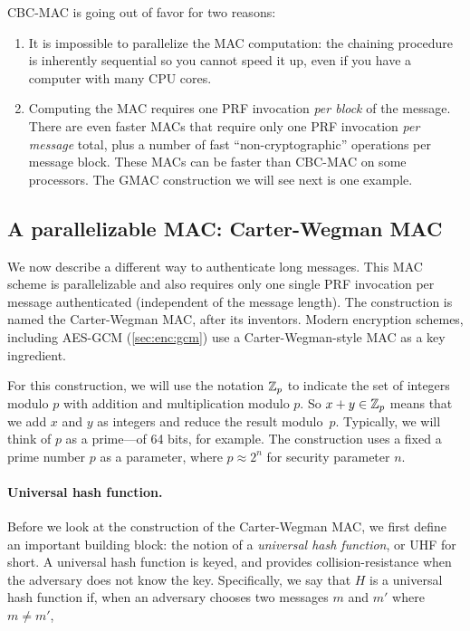 CBC-MAC is going out of favor for two reasons:
\begin{enumerate}
  \item It is impossible to parallelize the MAC computation:
        the chaining procedure is inherently sequential so you 
        cannot speed it up, even if you have a computer with many 
        CPU cores.
  \item Computing the MAC requires one PRF invocation \emph{per block} of the message.
        There are even faster MACs that require only one PRF invocation
        \emph{per message} total, 
        plus a number of fast ``non-cryptographic'' operations
        per message block.
        These MACs can be faster than CBC-MAC on some processors.
        The GMAC construction we will see next is one example.
\end{enumerate}


\subsection{A parallelizable MAC: Carter-Wegman MAC}\label{sec:mac:cw}

We now describe a different way to authenticate long messages.
This MAC scheme is parallelizable and also requires only one 
single PRF invocation per message authenticated (independent of
the message length).
The construction is named the Carter-Wegman MAC, after its
inventors.\autocite{CW81}
Modern encryption schemes, including AES-GCM (\cref{sec:enc:gcm})
use a Carter-Wegman-style MAC as a key ingredient.

For this construction, we will use the notation
$\mathbb{Z}_p$ to indicate the set of integers modulo $p$
with addition and multiplication modulo $p$.
So $x + y \in \mathbb{Z}_p$ means that we add $x$ and $y$
as integers and reduce the result modulo~$p$.
Typically, we will think of $p$ as a prime---of
64 bits, for example.
The construction uses a fixed a prime number $p$ as a parameter,
where $p \approx 2^n$ for security parameter $n$.

\paragraph{Universal hash function.}

Before we look at the construction of the Carter-Wegman MAC, we first
define an important building block: the notion of a \emph{universal hash
function}, or UHF for short.  A universal hash function is keyed, and
provides collision-resistance when the adversary does not know the key.
Specifically, we say that $H$ is a universal hash function if, when an
adversary chooses two messages $m$ and $m'$ where $m\neq m'$,

